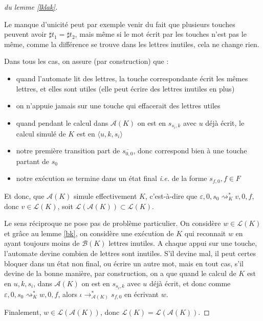 \documentclass[12pt, a4paper]{article}
\renewcommand{\L}{\mathcal{L}}
\newcommand{\A}{\mathcal{A}}
\begin{document}
\begin{proof}[du lemme \ref{lklak}]
\begin{enumerate}
       \end{enumerate}
       Le manque d'unicité peut par exemple venir du fait que plusieurs touches peuvent avoir $\sharp t_1 = \sharp t_2$, mais même si le mot écrit par les touches n'est pas le même, comme la différence se trouve dans les lettres inutiles, cela ne change rien.

       Dans tous les cas, on assure (par construction) que :
       \begin{itemize}
        \item quand l'automate lit des lettres, la touche correspondante écrit les mêmes lettres, et elles sont utiles (elle peut écrire des lettres inutiles en plus)
        \item on n'appuie jamais sur une touche qui effacerait des lettres utiles 
        \item quand pendant le calcul dans $\A(K)$ on est en $s_{s_i,k}$ avec $u$ déjà écrit, le calcul simulé de $K$ est en $\langle u,k,s_i\rangle$
        \item notre première transition part de $\overline{s_{0,0}}$, donc correspond bien à une touche partant de $s_0$ 
        \item notre exécution se termine dans un état final \textit{i.e.} de la forme $s_{f,0}, f \in F$
       \end{itemize} 
       Et donc, que $\A(K)$ simule effectivement $K$, c'est-à-dire que $\varepsilon,0,s_0 \rightsquigarrow^*_K v,0,f$, donc $v \in \L(K)$, soit $\L(\A(K)) \subset \L(K)$.

       Le sens réciproque ne pose pas de problème particulier. On considère $w \in \L(K)$ et grâce au lemme \ref{bk}, on considère une exécution de $K$ qui reconnait $w$ en ayant toujours moins de $\mathcal{B}(K)$ lettres inutiles.
       A chaque appui sur une touche, l'automate devine combien de lettres sont inutiles. 
       S'il devine mal, il peut certes bloquer dans un état non final, ou écrire un autre mot, mais en tout cas, s'il devine de la bonne manière, par construction, on a que quand le calcul de $K$ est en $u,k,s_i$, dans $\A(K)$ on est en $s_{s_i,k}$ avec $u$ déjà écrit, et donc comme $\varepsilon,0,s_0 \rightsquigarrow^*_K w,0,f$, alors $\iota \rightarrow^*_{\A(K)} s_{f,0}$ en écrivant $w$. 
       
       Finalement, $w \in \L(\A(K))$, donc $\L(K) = \L(\A(K))$.
    \end{proof}

    \clearpage
    \printbibliography
\end{document}
